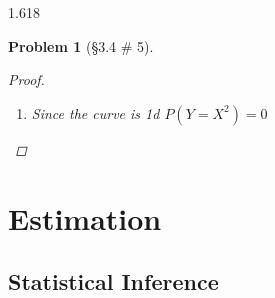 \documentclass[11pt, oneside]{book}   	%
\newtheorem{problem}{Problem}[section]
\begin{document}
\begin{spacing}{1.618}
\begin{problem}[\S 3.4 \# 5]
\begin{proof}
\begin{enumerate}
						\begin{alignat}{4}
							\int_{-1}^0\int_{0}^{x+1}\frac{5}{4}\left(x^2+y\right)~dy~dx&=\int_{-1}^0 \frac{5}{4}\left[x^2y+\frac{1}{2}y^2\right]_{y=0}^{x+1} ~dx \\
								&=\frac{5}{4}\int_{-1}^0\left(x^2(x+1)+\frac{1}{2}\left(x+1\right)^2\right)~dx \\
								&=\frac{5}{8}\int_{-1}^0\left(2x^3+2x^2+x^2+2x+1\right)~dx \\
								&=\frac{5}{8}\int_{-1}^0\left(2x^3+3x^2+2x+1\right)~dx \\
								&=\frac{5}{8}\left[ \frac{2}{4}x^4 + x^3 + x^2+x \right]_{x=-1}^0 \\
								&=\frac{5}{8}\left(-\frac{1}{2} + 1-1 +1\right) \\
								&=\frac{5}{8}\frac{1}{2} \\
								&=\frac{5}{16}
						\end{alignat}
						and
						\begin{alignat}{4}
							\int_{0}^1\int_{0}^{1-x^2} \frac{5}{4}\left(x^2+y\right)~dy~dx &= \frac{5}{4} \int_{0}^1 \left[x^2y+\frac{1}{2}y^2\right]_{y=0}^{1-x^2} ~dx \\
								&=\frac{5}{8}\int_{0}^1\left[-x^4+1\right]~dx \\
								&=\frac{5}{8}\left[-\frac{1}{5}x^5 + x\right]_{x=0}^1 \\
								&=\frac{5}{8}\frac{4}{5} \\
								&=\frac{1}{2}
						\end{alignat}
						and so 
						\begin{alignat}{4}
							P(Y\leq X+1) = \frac{5}{16} + \frac{1}{2} &= \frac{13}{16}
						\end{alignat}
						\item Since the curve is 1d $P(Y=X^2) = 0$
					\end{enumerate}
				\end{proof}
			\end{problem}

\chapter{Estimation}

	\section{Statistical Inference}
	

\end{spacing}
\end{document}
